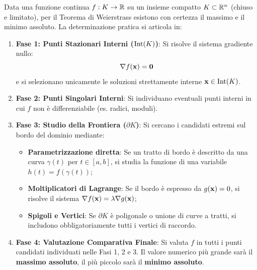 \begin{metodo}
Data una funzione continua $f: K \to \mathbb{R}$ su un insieme compatto $K \subset \mathbb{R}^n$ (chiuso e limitato), per il Teorema di Weierstrass esistono con certezza il massimo e il minimo assoluto. La determinazione pratica si articola in:
\begin{enumerate}
    \item \textbf{Fase 1: Punti Stazionari Interni ($\operatorname{Int}(K)$)}:
    Si risolve il sistema gradiente nullo:
    \[
    \nabla f(\mathbf{x}) = \mathbf{0}
    \]
    e si selezionano unicamente le soluzioni strettamente interne $\mathbf{x} \in \operatorname{Int}(K)$.
    
    \item \textbf{Fase 2: Punti Singolari Interni}:
    Si individuano eventuali punti interni in cui $f$ non è differenziabile (es. radici, moduli).
    
    \item \textbf{Fase 3: Studio della Frontiera ($\partial K$)}:
    Si cercano i candidati estremi sul bordo del dominio mediante:
    \begin{itemize}
        \item \textbf{Parametrizzazione diretta}: Se un tratto di bordo è descritto da una curva $\gamma(t)$ per $t \in [a, b]$, si studia la funzione di una variabile $h(t) = f(\gamma(t))$;
        \item \textbf{Moltiplicatori di Lagrange}: Se il bordo è espresso da $g(\mathbf{x}) = 0$, si risolve il sistema $\nabla f(\mathbf{x}) = \lambda \nabla g(\mathbf{x})$;
        \item \textbf{Spigoli e Vertici}: Se $\partial K$ è poligonale o unione di curve a tratti, si includono obbligatoriamente tutti i vertici di raccordo.
    \end{itemize}
    
    \item \textbf{Fase 4: Valutazione Comparativa Finale}:
    Si valuta $f$ in tutti i punti candidati individuati nelle Fasi 1, 2 e 3.
    Il valore numerico più grande sarà il \textbf{massimo assoluto}, il più piccolo sarà il \textbf{minimo assoluto}.
\end{enumerate}
\end{metodo}

